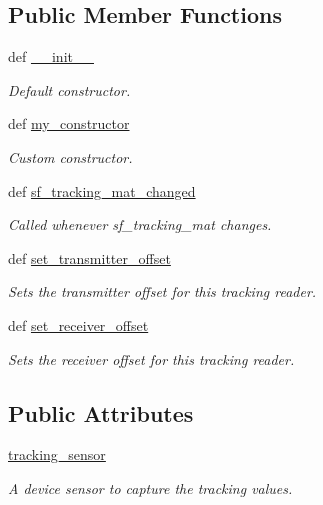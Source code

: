 \subsection*{\-Public \-Member \-Functions}
\begin{DoxyCompactItemize}
\item 
def \hyperlink{classlib_1_1TrackingReader_1_1TrackingTargetReader_a16e8a5c22b67a27c469f8d0c274c7865}{\-\_\-\-\_\-init\-\_\-\-\_\-}
\begin{DoxyCompactList}\small\item\em \-Default constructor. \end{DoxyCompactList}\item 
def \hyperlink{classlib_1_1TrackingReader_1_1TrackingTargetReader_a23023b23541d42c30f5bb5906ccaf8a3}{my\-\_\-constructor}
\begin{DoxyCompactList}\small\item\em \-Custom constructor. \end{DoxyCompactList}\item 
def \hyperlink{classlib_1_1TrackingReader_1_1TrackingTargetReader_a4711d9cbb47e0f3e8ce36bc602ab138a}{sf\-\_\-tracking\-\_\-mat\-\_\-changed}
\begin{DoxyCompactList}\small\item\em \-Called whenever sf\-\_\-tracking\-\_\-mat changes. \end{DoxyCompactList}\item 
def \hyperlink{classlib_1_1TrackingReader_1_1TrackingTargetReader_aa0cec238c80dab830dec93bacf360cfe}{set\-\_\-transmitter\-\_\-offset}
\begin{DoxyCompactList}\small\item\em \-Sets the transmitter offset for this tracking reader. \end{DoxyCompactList}\item 
def \hyperlink{classlib_1_1TrackingReader_1_1TrackingTargetReader_a5b5a2de4121284d689aeaea202088b61}{set\-\_\-receiver\-\_\-offset}
\begin{DoxyCompactList}\small\item\em \-Sets the receiver offset for this tracking reader. \end{DoxyCompactList}\end{DoxyCompactItemize}
\subsection*{\-Public \-Attributes}
\begin{DoxyCompactItemize}
\item 
\hyperlink{classlib_1_1TrackingReader_1_1TrackingTargetReader_ad7b8c73f24cbcbe803b83699a1493de7}{tracking\-\_\-sensor}
\begin{DoxyCompactList}\small\item\em \-A device sensor to capture the tracking values. \end{DoxyCompactList}\end{DoxyCompactItemize}
